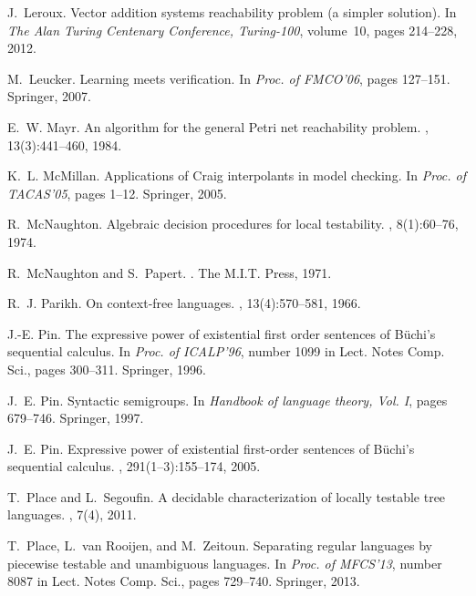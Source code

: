 \documentclass{LMCS}
\theoremstyle{plain}
\begin{document}
\begin{thebibliography}{10}
J.~Leroux.
\newblock Vector addition systems reachability problem (a simpler solution).
\newblock In {\em The Alan Turing Centenary Conference, Turing-100}, volume~10,
  pages 214--228, 2012.

M.~Leucker.
\newblock Learning meets verification.
\newblock In {\em Proc. of FMCO'06}, pages 127--151. Springer, 2007.

E.~W. Mayr.
\newblock An algorithm for the general {P}etri net reachability problem.
, 13(3):441--460, 1984.

K.~L. {McMillan}.
\newblock Applications of {C}raig interpolants in model checking.
\newblock In {\em Proc. of TACAS'05}, pages 1--12. Springer, 2005.

R.~{McNaughton}.
\newblock Algebraic decision procedures for local testability.
, 8(1):60--76, 1974.

R.~McNaughton and S.~Papert.
.
\newblock The M.I.T. Press, 1971.

R.~J. Parikh.
\newblock On context-free languages.
, 13(4):570--581, 1966.

J.-E. Pin.
\newblock The expressive power of existential first order sentences of
  {B}{\"u}chi's sequential calculus.
\newblock In {\em Proc. of ICALP'96}, number 1099 in Lect. Notes Comp. Sci.,
  pages 300--311. Springer, 1996.

J.~E. Pin.
\newblock Syntactic semigroups.
\newblock In {\em {Handbook of language theory, Vol. I}}, pages 679--746.
  Springer, 1997.

J.~E. Pin.
\newblock Expressive power of existential first-order sentences of
  {{B}}{\"u}chi's sequential calculus.
, 291(1--3):155--174, 2005.

T.~Place and L.~Segoufin.
\newblock A decidable characterization of locally testable tree languages.
, 7(4), 2011.

T.~Place, L.~{van Rooijen}, and M.~Zeitoun.
\newblock Separating regular languages by piecewise testable and unambiguous
  languages.
\newblock In {\em Proc. of MFCS'13}, number 8087 in Lect. Notes Comp. Sci.,
  pages 729--740. Springer, 2013.


\end{thebibliography}
\end{document}

